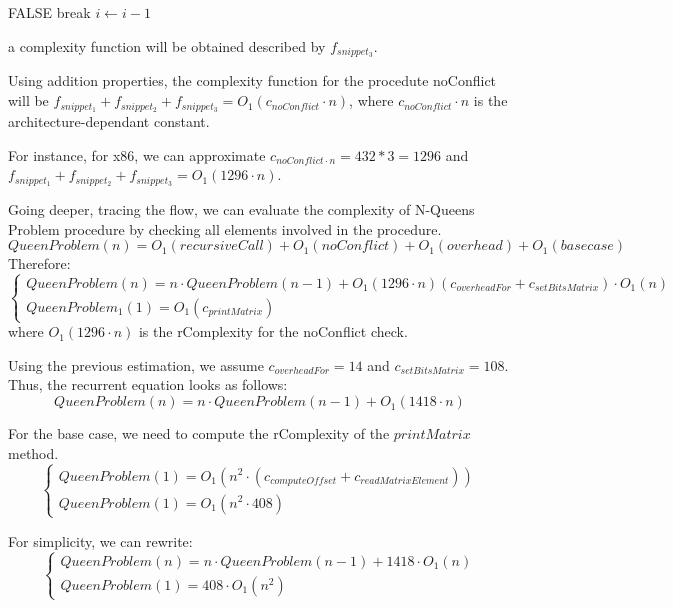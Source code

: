 \begin{algorithmic}[1]
			\State \Return FALSE
		\EndIf
		\State break
	\EndIf
	\State $i \gets i-1$	
	\EndFor
\end{algorithmic}
a complexity function will be obtained described by $f_{snippet_{3}}$.

Using addition properties, the complexity function for the procedute noConflict will be $f_{snippet_{1}} + f_{snippet_{2}} + f_{snippet_{3}} = O_{1}(c_{noConflict} \cdot n)$, where $c_{noConflict} \cdot n$ is the architecture-dependant constant.

 For instance, for x86, we can approximate $c_{noConflict \cdot n} = 432 * 3 = 1296$ and $f_{snippet_{1}} + f_{snippet_{2}} + f_{snippet_{3}} = O_{1}(1296 \cdot n) $.



Going deeper, tracing the flow, we can evaluate the complexity of N-Queens Problem procedure by checking all elements involved in the procedure.
 \[QueenProblem(n) = O_{1}(recursiveCall) + O_{1}(noConflict) + O_{1}(overhead) + O_{1}(basecase) \]
Therefore:
 \[\begin{cases} QueenProblem(n) = n \cdot QueenProblem(n-1) +  O_{1}(1296 \cdot n) (c_{overheadFor} + c_{setBitsMatrix}) \cdot O_{1}(n) \\ QueenProblem_{1}(1)=O_{1}(c_{printMatrix}) \end{cases}\]
 where $O_{1}(1296 \cdot n)$ is the rComplexity for the noConflict check.
 
Using the previous estimation, we assume $c_{overheadFor} = 14$ and $c_{setBitsMatrix} = 108$. Thus, the recurrent equation looks as follows: 
\[QueenProblem(n) = n \cdot QueenProblem(n-1) +  O_{1}(1418 \cdot n) \]

For the base case, we need to compute the rComplexity of the $printMatrix$ method.
\[ \begin{cases} QueenProblem(1)=O_{1}(n^{2} \cdot  (c_{computeOffset} + c_{readMatrixElement})) \\ QueenProblem(1)=O_{1}(n^{2} \cdot  408) \end{cases}\]

For simplicity, we can rewrite:
\[ \begin{cases} QueenProblem(n) = n \cdot QueenProblem(n-1) +  1418 \cdot O_{1}(n) \\ QueenProblem(1)= 408 \cdot O_{1}(n^{2}) \end{cases}\]

